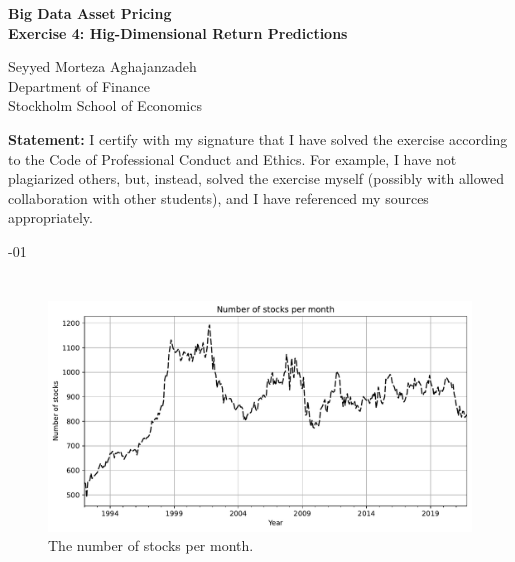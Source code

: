 \documentclass[hidelinks,12pt]{article}
\begin{document}
\begin{titlepage}
    \begin{center}
        \vspace*{1cm}
        
        
        
        \large
        \textbf{Big Data Asset Pricing \\ Exercise 4: Hig-Dimensional Return Predictions}
            
        
        \normalsize
        Seyyed Morteza Aghajanzadeh \\
        Department of Finance \\
        Stockholm School of Economics
        
        \vfill
        \normalsize
        \justifying
        \noindent
        \textbf{Statement:} I certify with my signature that I have solved the exercise according to the Code of Professional Conduct and Ethics. 
        For example, I have not plagiarized others, but, instead, solved the exercise myself (possibly with allowed collaboration with other students), and I have referenced my sources appropriately.

        \vfill
        
        \vspace{0.8cm}
            
        
        \vspace{0.8cm}
        \normalsize
        -01
            
    \end{center}
\end{titlepage}

\section{}
\begin{figure}[htbp]
    \centering
    \caption{The number of stocks per month.}
    \includegraphics[width=.95\textwidth]{out/1.pdf}
\end{figure}
\end{document}
